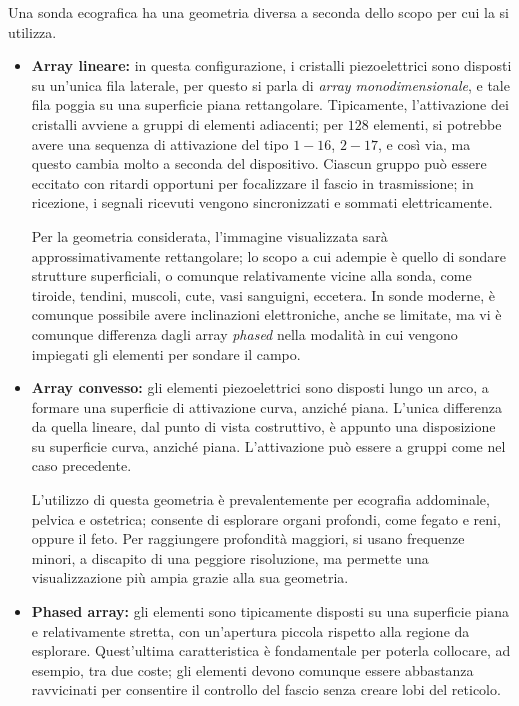 \documentclass[11pt, a4paper]{scrartcl}
\theoremstyle{style}
\theoremstyle{style1}
\numberwithin{equation}{subsection}
\begin{document}
\noindent Una sonda ecografica ha una geometria diversa a seconda dello scopo per cui la si utilizza.
\begin{itemize}
	\item \textbf{Array lineare:} in questa configurazione, i cristalli piezoelettrici sono disposti su un'unica fila laterale, per questo si parla di \textit{array monodimensionale}, e tale fila poggia su una superficie piana rettangolare.
		Tipicamente, l'attivazione dei cristalli avviene a gruppi di elementi adiacenti; per $128$ elementi, si potrebbe avere una sequenza di attivazione del tipo $1-16$, $2-17$, e cos\`i via, ma questo cambia molto a seconda del dispositivo.
		Ciascun gruppo pu\`o essere eccitato con ritardi opportuni per focalizzare il fascio in trasmissione; in ricezione, i segnali ricevuti vengono sincronizzati e sommati elettricamente.

		Per la geometria considerata, l'immagine visualizzata sar\`a approssimativamente rettangolare; lo scopo a cui adempie \`e quello di sondare strutture superficiali, o comunque relativamente vicine alla sonda, come tiroide, tendini, muscoli, cute, vasi sanguigni, eccetera.
		In sonde moderne, \`e comunque possibile avere inclinazioni elettroniche, anche se limitate, ma vi \`e comunque differenza dagli array \textit{phased} nella modalit\`a in cui vengono impiegati gli elementi per sondare il campo.
	\item \textbf{Array convesso:} gli elementi piezoelettrici sono disposti lungo un arco, a formare una superficie di attivazione curva, anzich\'e piana. 
		L'unica differenza da quella lineare, dal punto di vista costruttivo, \`e appunto una disposizione su superficie curva, anzich\'e piana.
		L'attivazione pu\`o essere a gruppi come nel caso precedente.

		L'utilizzo di questa geometria \`e prevalentemente per ecografia addominale, pelvica e ostetrica; consente di esplorare organi profondi, come fegato e reni, oppure il feto.
		Per raggiungere profondit\`a maggiori, si usano frequenze minori, a discapito di una peggiore risoluzione, ma permette una visualizzazione pi\`u ampia grazie alla sua geometria.
	\item \textbf{Phased array:} gli elementi sono tipicamente disposti su una superficie piana e relativamente stretta, con un'apertura piccola rispetto alla regione da esplorare.
			Quest'ultima caratteristica \`e fondamentale per poterla collocare, ad esempio, tra due coste; gli elementi devono comunque essere abbastanza ravvicinati per consentire il controllo del fascio senza creare lobi del reticolo.


\end{itemize}
\end{document}
